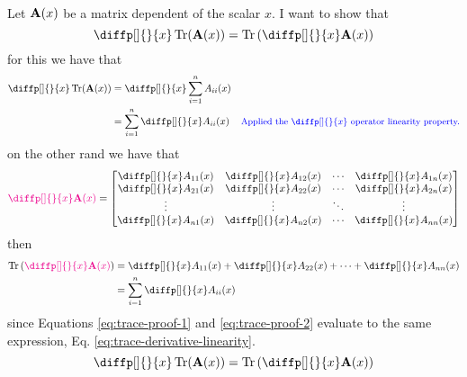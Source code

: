 \documentclass[12pt]{article}
\begin{document}
 \\
Let $\boldsymbol{\mathbf{A}}(x)$ be a matrix dependent of the scalar $x$. I want to show that
\begin{equation*}
    \diffp[]{}{x}\Tr(\mat{A}(x)) = \Tr\parentheses{\diffp[]{}{x}\mat{A}(x)}
\end{equation*}
for this we have that
\begin{equation}
\begin{aligned}
    \diffp[]{}{x}\Tr(\mat{A}(x)) &= \diffp[]{}{x} \Sum{1}{n} A_{ii}(x)\\
    &= \Sum{1}{n} \diffp[]{}{x} A_{ii}(x) & \text{\small \blue{Applied the $\diffp[]{}{x}$ operator linearity property.}}
\end{aligned}
\label{eq:trace-proof-1}
\end{equation}
on the other rand we have that
\renewcommand{\arraystretch}{1.5}
\begin{equation*}
    \magenta{\diffp[]{}{x} \mat{A}(x)} = \begin{bmatrix}
        \diffp[]{}{x}A_{11}(x) & \diffp[]{}{x} A_{12}(x) & \cdots & \diffp[]{}{x} A_{1n}(x) \\
        \diffp[]{}{x}A_{21}(x) & \diffp[]{}{x} A_{22}(x) & \cdots & \diffp[]{}{x} A_{2n}(x) \\
        \vdots & \vdots & \ddots & \vdots \\
        \diffp[]{}{x}A_{n1}(x) & \diffp[]{}{x} A_{n2}(x) & \cdots & \diffp[]{}{x} A_{nn}(x) \\
    \end{bmatrix}   
\end{equation*}
\renewcommand{\arraystretch}{1}
then
\begin{equation}
\begin{aligned}
    \Tr\parentheses{\magenta{\diffp[]{}{x}\mat{A}(x)}} &= \diffp[]{}{x}A_{11}(x) + \diffp[]{}{x}A_{22}(x) + \dots + \diffp[]{}{x}A_{nn}(x)\\
    &= \Sum{1}{n} \diffp[]{}{x} A_{ii}(x)
\end{aligned}
\label{eq:trace-proof-2}
\end{equation}
since Equations \ref{eq:trace-proof-1} and \ref{eq:trace-proof-2} evaluate to the same expression, Eq. \ref{eq:trace-derivative-linearity}.
\begin{equation}
    \diffp[]{}{x}\Tr(\mat{A}(x)) = \Tr\parentheses{\diffp[]{}{x}\mat{A}(x)}
    \label{eq:trace-derivative-linearity}
\end{equation}
\end{document}
